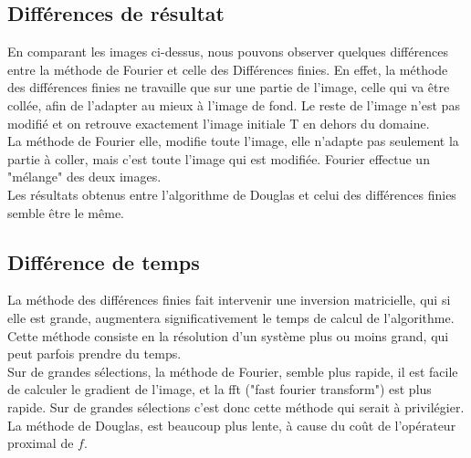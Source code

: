 \newpage
\subsection{Différences de résultat}
En comparant les images ci-dessus, nous pouvons observer quelques différences entre la méthode de Fourier et celle des Différences finies. En effet, la méthode des différences finies ne travaille que sur une partie de l'image, celle qui va être collée, afin de l'adapter au mieux à l'image de fond. Le reste de l'image n'est pas modifié et on retrouve exactement l'image initiale T en dehors du domaine. \\
La méthode de Fourier elle, modifie toute l'image, elle n'adapte pas seulement la partie à coller, mais c'est toute l'image qui est modifiée. Fourier effectue un "mélange" des deux images. \\
Les résultats obtenus entre l'algorithme de Douglas et celui des différences finies semble être le même.
\subsection{Différence de temps}
La méthode des différences finies fait intervenir une inversion matricielle, qui si elle est grande, augmentera significativement le temps de calcul de l'algorithme. Cette méthode consiste en la résolution d'un système plus ou moins grand, qui peut parfois prendre du temps. \\
Sur de grandes sélections, la méthode de Fourier, semble plus rapide, il est facile de calculer le gradient de l'image, et la fft ("fast fourier transform") est plus rapide. Sur de grandes sélections c'est donc cette méthode qui serait à privilégier.\\
La méthode de Douglas, est beaucoup plus lente, à cause du coût de l'opérateur proximal de $f$.  

